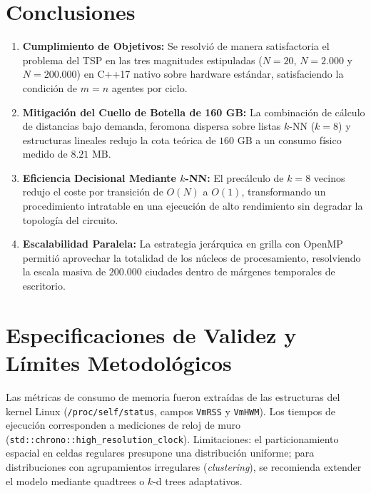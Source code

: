 \documentclass[11pt,a4paper]{article}
\begin{document}
\section{Conclusiones}

\begin{enumerate}
    \item \textbf{Cumplimiento de Objetivos:} Se resolvió de manera satisfactoria el problema del TSP en las tres magnitudes estipuladas ($N=20$, $N=2.000$ y $N=200.000$) en C++17 nativo sobre hardware estándar, satisfaciendo la condición de $m=n$ agentes por ciclo.
    \item \textbf{Mitigación del Cuello de Botella de 160 GB:} La combinación de cálculo de distancias bajo demanda, feromona dispersa sobre listas $k$-NN ($k=8$) y estructuras lineales redujo la cota teórica de $160\text{ GB}$ a un consumo físico medido de \textbf{$8.21\text{ MB}$}.
    \item \textbf{Eficiencia Decisional Mediante $k$-NN:} El precálculo de $k=8$ vecinos redujo el coste por transición de $O(N)$ a $O(1)$, transformando un procedimiento intratable en una ejecución de alto rendimiento sin degradar la topología del circuito.
    \item \textbf{Escalabilidad Paralela:} La estrategia jerárquica en grilla con OpenMP permitió aprovechar la totalidad de los núcleos de procesamiento, resolviendo la escala masiva de $200.000$ ciudades dentro de márgenes temporales de escritorio.
\end{enumerate}

\section*{Especificaciones de Validez y Límites Metodológicos}
Las métricas de consumo de memoria fueron extraídas de las estructuras del kernel Linux (\texttt{/proc/self/status}, campos \texttt{VmRSS} y \texttt{VmHWM}). Los tiempos de ejecución corresponden a mediciones de reloj de muro (\texttt{std::chrono::high\_resolution\_clock}). Limitaciones: el particionamiento espacial en celdas regulares presupone una distribución uniforme; para distribuciones con agrupamientos irregulares (\emph{clustering}), se recomienda extender el modelo mediante quadtrees o $k$-d trees adaptativos.
\end{document}

